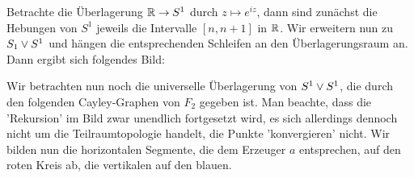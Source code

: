 \begin{example}
    Betrachte die Überlagerung $\mathbb{R} \to  S^1$ durch $z \mapsto e^{iz}$, dann sind zunächst die Hebungen von $S^1$ jeweils die Intervalle  $[n,n+1]$ in  $\mathbb{R}$. Wir erweitern nun zu $S_1 \vee S^1$ und hängen die entsprechenden Schleifen an den Überlagerungsraum an. Dann ergibt sich folgendes Bild:
\end{example}

\begin{example}
    Wir betrachten nun noch die universelle Überlagerung von $S^1 \vee S^1$, die durch den folgenden Cayley-Graphen von $F_2$ gegeben ist. Man beachte, dass die 'Rekursion' im Bild zwar unendlich fortgesetzt wird, es sich allerdings dennoch nicht um die Teilraumtopologie handelt, die Punkte 'konvergieren' nicht. Wir bilden nun die horizontalen Segmente, die dem Erzeuger $a$ entsprechen, auf den roten Kreis ab, die vertikalen auf den blauen.

\end{example}

